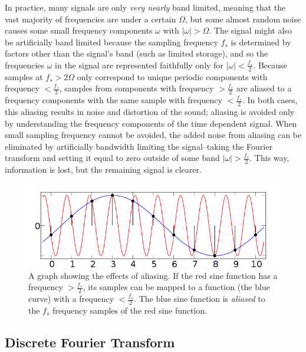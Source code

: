 \documentclass[12pt]{article}
\begin{document}
In practice, many signals are only \emph{very nearly} band limited, meaning
that the vast majority of frequencies are under a certain \( \Omega \), but
some almost random noise causes some small frequency components \( \omega \)
with \( |\omega| > \Omega \). The signal might also be artificially band
limited because the sampling frequency \( f_s\) is determined by factors other
than the signal's band (such as limited storage), and so the frequencies \(
\omega \) in the signal are represented faithfully only for \(|\omega| <
\frac{f_s}{2} \). Because samples at \( f_s > 2\Omega \) only correspond to
unique periodic components with frequency \( < \frac{f_s}{2} \), samples from
components with frequency \( > \frac{f_s}{2} \) are aliased to a frequency
components with the same sample with frequency \( < \frac{f_s}{2} \). In both
cases, this aliasing results in noise and distortion of the sound; aliasing is
avoided only by understanding the frequency components of the time dependent
signal. When small sampling frequency cannot be avoided, the added noise from
aliasing can be eliminated by artificially bandwidth limiting the
signal--taking the Fourier transform and setting it equal to zero outside of
some band \( |\omega| > \frac{f_s}{2}  \). This way, information is lost, but
the remaining signal is clearer. 

\begin{figure}[H]
\begin{centering}
\includegraphics[width=.5\linewidth]{AliasingSines.png}
\caption{A graph showing the effects of aliasing. If the red sine function 
has a frequency \( > \frac{f_s}{2}\), its samples can be mapped to a function
(the blue curve) with a frequency \( < \frac{f_s}{2}\). The blue sine 
function is \emph{aliased} to the \( f_s\) frequency samples of the red sine
function.}
\end{centering}
\end{figure}


\subsection{Discrete Fourier Transform}
\end{document}
